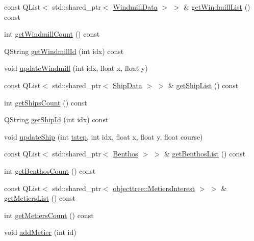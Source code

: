 \begin{DoxyCompactItemize}
\item 
const Q\+List$<$ std\+::shared\+\_\+ptr$<$ \mbox{\hyperlink{class_windmill_data}{Windmill\+Data}} $>$ $>$ \& \mbox{\hyperlink{class_displace_model_a8e6483b053022348ae9ef2f3ebb12cf8}{get\+Windmill\+List}} () const
\item 
int \mbox{\hyperlink{class_displace_model_a4abcdf4aa9268b3e9e88a1c098d7b165}{get\+Windmill\+Count}} () const
\item 
Q\+String \mbox{\hyperlink{class_displace_model_a5558f67ffe30cdef4b879a240f8b786f}{get\+Windmill\+Id}} (int idx) const
\item 
void \mbox{\hyperlink{class_displace_model_abaae8b3985bd60919da5d7ccf01c4872}{update\+Windmill}} (int idx, float x, float y)
\item 
const Q\+List$<$ std\+::shared\+\_\+ptr$<$ \mbox{\hyperlink{class_ship_data}{Ship\+Data}} $>$ $>$ \& \mbox{\hyperlink{class_displace_model_a0812363c20f2636058b848fb4f7b50f3}{get\+Ship\+List}} () const
\item 
int \mbox{\hyperlink{class_displace_model_ac83b2bd8ed07d022703ba60070e09510}{get\+Ships\+Count}} () const
\item 
Q\+String \mbox{\hyperlink{class_displace_model_afd19f6e26abdab7b7f8920ca63fcf21c}{get\+Ship\+Id}} (int idx) const
\item 
void \mbox{\hyperlink{class_displace_model_a8570224800c327eeea82febef89ca670}{update\+Ship}} (int \mbox{\hyperlink{thread__vessels_8cpp_a84bc73d278de929ec9974e1a95d9b23a}{tstep}}, int idx, float x, float y, float course)
\item 
const Q\+List$<$ std\+::shared\+\_\+ptr$<$ \mbox{\hyperlink{class_benthos}{Benthos}} $>$ $>$ \& \mbox{\hyperlink{class_displace_model_a945ad6630da3b08c53debb7e427d1f3e}{get\+Benthos\+List}} () const
\item 
int \mbox{\hyperlink{class_displace_model_a5a33ee936ada41a01220afbf341bd37e}{get\+Benthos\+Count}} () const
\item 
const Q\+List$<$ std\+::shared\+\_\+ptr$<$ \mbox{\hyperlink{classobjecttree_1_1_metiers_interest}{objecttree\+::\+Metiers\+Interest}} $>$ $>$ \& \mbox{\hyperlink{class_displace_model_a94f3df2e0af6987830e254cca0a9804c}{get\+Metiers\+List}} () const
\item 
int \mbox{\hyperlink{class_displace_model_abcdffaf5e06dcc5402f42931942eb2c5}{get\+Metiers\+Count}} () const
\item 
void \mbox{\hyperlink{class_displace_model_a08c5c691dae50b81dad0866b6f13ad39}{add\+Metier}} (int id)
\item 

\end{DoxyCompactItemize}

